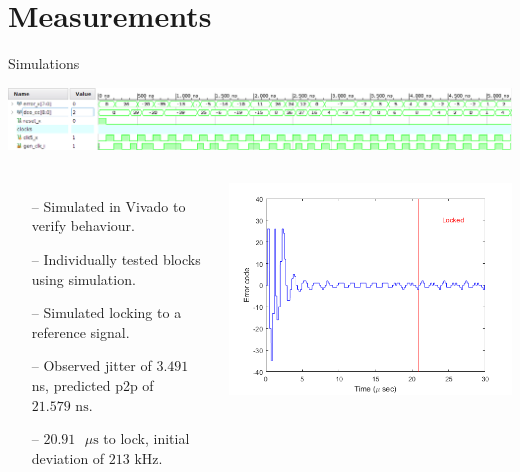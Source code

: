 \documentclass{beamer}
\begin{document}
\section*{Measurements}
\begin{frame}{Simulations}
	\vspace*{-10mm}
 	\begin{center}
 		\includegraphics[scale=0.25]{../vivado_sim}
 	\end{center}
	\begin{columns}
    \begin{itemize}
	    \item[--]
	        Simulated in Vivado to verify behaviour.
	    \item[--]
	        Individually tested blocks using simulation.
	    \item[--]
	        Simulated locking to a reference signal.
	    \item[--]
            Observed jitter of $3.491$ ns, predicted p2p of $21.579\textrm{ ns}$.
	    \item[--]
            $20.91\textrm{ }\mu\textrm{s}$ to lock, initial deviation of $213\textrm{ kHz}$.
	\end{itemize}
	
	\includegraphics[scale=0.4]{../sim_locking}
	\end{columns}

\end{frame}
\end{document}
